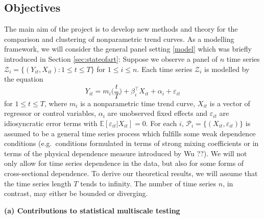 \documentclass[a4paper,12pt]{article}
\begin{document}
\subsection{Objectives}\label{sec:objectives}


The main aim of the project is to develop new methods and theory for the comparison and clustering of nonparametric trend curves. As a modelling framework, we will consider the general panel setting \eqref{model} which was briefly introduced in Section \ref{sec:stateofart}:  Suppose we observe a panel of $n$ time series $\mathcal{Z}_i = \{(Y_{it},X_{it}): 1 \le t \le T\}$ for $ 1 \le i \le n$. Each time series $\mathcal{Z}_i$ is modelled by the equation 
\begin{equation}\label{model-objectives}
Y_{it} = m_i \Big( \frac{t}{T} \Big) + \beta_i^\top X_{it} + \alpha_i + \varepsilon_{it} 
\end{equation}
for $ 1 \le t \le T$, where $m_i$ is a nonparametric time trend curve, $X_{it}$ is a vector of regressor or control variables, $\alpha_i$ are unobserved fixed effects and $\varepsilon_{it}$ are idiosyncratic error terms with $\mathbb{E}[\varepsilon_{it}|X_{it} ] = 0$. For each $i$, $\mathcal{P}_i = \{(X_{it},\varepsilon_{it})\}$ is assumed to be a general time series process which fulfills some weak dependence conditions (e.g.\ conditions formulated in terms of strong mixing coefficients or in terms of the physical dependence measure introduced by Wu ??). We will not only allow for time series dependence in the data, but also for some forms of cross-sectional dependence. To derive our theoretical results, we will assume that the time series length $T$ tends to infinity. The number of time series $n$, in contrast, may either be bounded or diverging. 
\vspace{15pt}


\noindent \textbf{(a) Contributions to statistical multiscale testing} 
\vspace{10pt} 
\end{document}
